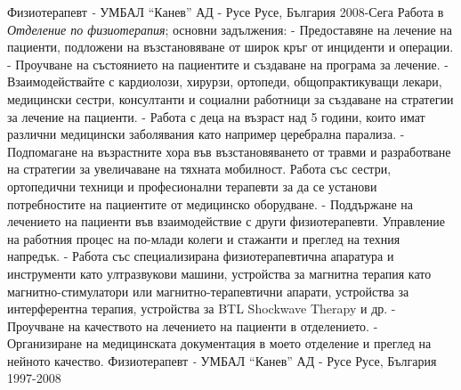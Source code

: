 

\cventry
{Физиотерапевт \textit{-} УМБАЛ “Канев” АД - Русе}
{Русе, България 2008-Сега}
{
Работа в \textit{Отделение по физиотерапия}; основни задължения:
\newline
\hspace{3ex} - Предоставяне на лечение на пациенти, подложени на възстановяване от широк кръг от инциденти и операции.
\newline
\hspace{3ex} - Проучване на състоянието на пациентите и създаване на програма за лечение.
\newline
\hspace{3ex} - Взаимодействайте с кардиолози, хирурзи, ортопеди, общопрактикуващи лекари, медицински сестри, консултанти и социални работници за създаване на стратегии за лечение на пациенти.
\newline
\hspace{3ex} - Работа с деца на възраст над 5 години, които имат различни медицински заболявания като например церебрална парализа.
\newline
\hspace{3ex} - Подпомагане на възрастните хора във възстановяването от травми и разработване на стратегии за увеличаване на тяхната мобилност. Работа със сестри, ортопедични техници и професионални терапевти за да се установи потребностите на пациентите от медицинско оборудване.
\newline
\hspace{3ex} - Поддържане на лечението на пациенти във взаимодействие с други физиотерапевти. Управление на работния процес на по-млади колеги и стажанти и преглед на техния напредък.
\newline
\hspace{3ex} - Работа със специализирана физиотерапевтична апаратура и инструменти като ултразвукови машини, устройства за магнитна терапия като магнитно-стимулатори или магнитно-терапевтични апарати, устройства за интерферентна терапия, устройства за BTL Shockwave Therapy и др.
\newline
\hspace{3ex} - Проучване на качеството на лечението на пациенти в отделението.
\newline
\hspace{3ex} - Организиране на медицинската документация в моето отделение и преглед на нейното качество.
}
\vspace{+3mm}
\cventry
{Физиотерапевт \textit{-} УМБАЛ “Канев” АД - Русе}
{Русе, България 1997-2008}
